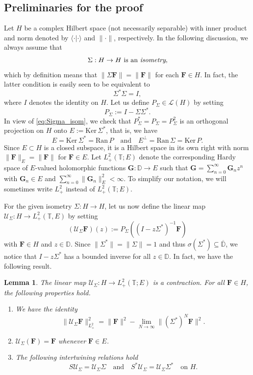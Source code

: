 \documentclass[10pt,reqno,a4paper]{amsart}
\newtheorem{lem}{Lemma}[section]
\theoremstyle{definition}
\theoremstyle{remark}
\theoremstyle{remark}
\numberwithin{equation}{section}
\newcommand{\T}{\mathbb{T}}
\newcommand{\D}{\mathbb{D}}
\newcommand{\ov}{\overline}
\newcommand{\ran}{\mathrm{Ran}}
\renewcommand{\ker}{\mathrm{Ker}}
\newcommand{\be}{\begin{equation}}
\newcommand{\ee}{\end{equation}}
\newcommand{\Fb}{\mathbf{F}}
\newcommand{\Gb}{\mathbf{G}}
\newcommand{\id}{I}
\newcommand{\Us}{\mathscr{U}}
\newcommand{\Ls}{\mathscr{L}}
\begin{document}
\subsection{Preliminaries for the proof}
\label{subsec:prelim}
Let $H$ be a complex Hilbert space (not necessarily separable) with inner product and norm denoted by $\langle \cdot | \cdot \rangle$ and $\| \cdot \|$, respectively. In the following discussion, we always assume that
$$
\mbox{$\Sigma : H \to H$ is an {\em isometry}},
$$
which by definition means that $\| \Sigma \Fb \| = \| \Fb \|$ for each $\Fb \in H$. In fact, the latter condition is easily seen to be equivalent to
\be \label{eq:Sigma_isom}
\Sigma^* \Sigma = \id,
\ee
where $\id$ denotes the identity on $H$. Let us define $P_\Sigma \in \Ls(H)$ by setting
$$
P_\Sigma := \id - \Sigma \Sigma^*.
$$
In view of \eqref{eq:Sigma_isom}, we check that $P_\Sigma^* = P_\Sigma = P_\Sigma^2$ is an orthogonal projection on $H$ onto $E:= \ker \, \Sigma^*$, that is, we have
$$
E = \ker \, \Sigma^* = \ran \, P \quad \mbox{and} \quad E^\perp = \ran \, \Sigma = \ker \, P.
$$
Since $E \subset H$ is a closed subspace, it is a Hilbert space in its own right with norm $\| \Fb \|_E = \| \Fb \|$ for $\Fb \in E$. Let $L^2_+(\T;E)$ denote the corresponding Hardy space of $E$-valued holomorphic functions $\Gb: \D \to E$ such that $\Gb= \sum_{n=0}^\infty \Gb_n z^n$ with $\Gb_n \in E$ and $\sum_{n=0}^\infty \| \Gb_n \|_E^2 < \infty$. To simplify our notation, we will sometimes write $L^2_+$ instead of $L^2_+(\T;E)$.

For the given isometry $\Sigma : H \to H$, let us now define the linear map $\Us_\Sigma : H \to L^2_+(\T,E)$ by setting
\be
\boxed{ (\Us_\Sigma \Fb )(z) := P_\Sigma \left ( (\id- z \Sigma^*)^{-1} \Fb \right )}
\ee
with $\Fb \in H$ and $z \in \D$. Since $\| \Sigma^* \|  = \| \Sigma \|=1$ and thus $\sigma(\Sigma^*) \subseteq \ov{\D}$, we notice that $\id-z \Sigma^*$ has a bounded inverse for all $z \in \D$. In fact, we have the following result.

\begin{lem} \label{lem:UsSigma}
The linear map $\Us_\Sigma : H \to L^2_+(\T;E)$ is a contraction. For all $\Fb \in H$, the following properties hold.
\begin{enumerate}
\item[(i)] We have the identity
$$
\| \Us_\Sigma \Fb \|_{L^2_+}^2 = \| \Fb \|^2 - \lim_{N \to \infty} \| (\Sigma^*)^N \Fb \|^2.
$$
\item[(ii)] $\Us_\Sigma(\Fb) = \Fb$ whenever $\Fb \in E$.
\item[(iii)] The following intertwining relations hold
$$
S \Us_\Sigma = \Us_\Sigma \Sigma \quad \mbox{and} \quad S^* \Us_\Sigma = \Us_{\Sigma} \Sigma^* \quad \mbox{on $H$}.
$$ 
\end{enumerate}
\end{lem}
\end{document}
